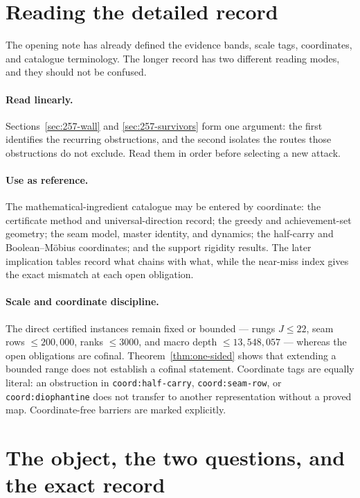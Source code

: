 \documentclass[11pt]{article}
\theoremstyle{plain}
\theoremstyle{definition}
\theoremstyle{remark}
\newcommand{\coord}[1]{\texorpdfstring{{\small\nolinkurl{coord:#1}}}{coord:#1}\xspace}
\begin{document}
\section{Reading the detailed record}
\label{sec:257-howto}

The opening note has already defined the evidence bands, scale tags,
coordinates, and catalogue terminology.  The longer record has two different
reading modes, and they should not be confused.

\paragraph{Read linearly.} Sections~\ref{sec:257-wall} and
\ref{sec:257-survivors} form one argument: the first identifies the recurring
obstructions, and the second isolates the routes those obstructions do not
exclude.  Read them in order before selecting a new attack.

\paragraph{Use as reference.} The mathematical-ingredient catalogue may be
entered by coordinate: the certificate method and universal-direction record;
the greedy and achievement-set geometry; the seam model, master identity, and
dynamics; the half-carry and Boolean--M\"obius coordinates; and the support
rigidity results.  The later implication tables record what chains with what,
while the near-miss index gives the exact mismatch at each open obligation.

\paragraph{Scale and coordinate discipline.} The direct certified instances
remain fixed or bounded --- rungs $J \le 22$, seam rows $\le 200{,}000$, ranks
$\le 3000$, and macro depth $\le 13{,}548{,}057$ --- whereas the open
obligations are cofinal.  Theorem~\ref{thm:one-sided} shows that extending a
bounded range does not establish a cofinal statement.  Coordinate tags are
equally literal: an obstruction in \coord{half-carry}, \coord{seam-row}, or
\coord{diophantine} does not transfer to another representation without a
proved map.  Coordinate-free barriers are marked explicitly.
\section{The object, the two questions, and the exact record}
\end{document}
